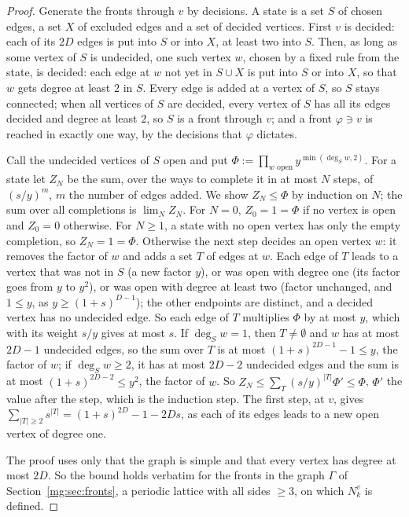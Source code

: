 \documentclass[11pt,a4paper]{article}
\theoremstyle{definition}
\theoremstyle{remark}
\begin{document}
\begin{proof}
Generate the fronts through $v$ by decisions. A state is a set $S$ of chosen edges, a set $X$ of excluded edges and a set of decided vertices. First $v$ is
decided: each of its $2D$ edges is put into $S$ or into $X$, at least two into $S$. Then, as long as some vertex of $S$ is undecided, one such vertex $w$,
chosen by a fixed rule from the state, is decided: each edge at $w$ not yet in $S\cup X$ is put into $S$ or into $X$, so that $w$ gets degree at least
$2$ in $S$. Every edge is added at a vertex of $S$, so $S$ stays connected; when all vertices of $S$ are decided, every vertex of $S$ has all its edges decided
and degree at least $2$, so $S$ is a front through $v$; and a front $\varphi\ni v$ is reached in exactly one way, by the decisions that $\varphi$ dictates.

Call the undecided vertices of $S$ open and put $\Phi:=\prod_{w\text{ open}}y^{\min(\deg_Sw,2)}$. For a state let $Z_N$ be the sum, over the ways to complete
it in at most $N$ steps, of $(s/y)^m$, $m$ the number of edges added. We show $Z_N\le\Phi$ by induction on $N$; the sum over all completions is $\lim_NZ_N$. For
$N=0$, $Z_0=1=\Phi$ if no vertex is open and $Z_0=0$ otherwise. For $N\ge1$, a state with no open vertex has only the empty completion, so $Z_N=1=\Phi$. Otherwise the next
step decides an open vertex $w$: it removes the factor of $w$ and adds a set $T$ of edges at $w$. Each edge of $T$ leads to a vertex that was not in $S$ (a new
factor $y$), or was open with degree one (its factor goes from $y$ to $y^2$), or was open with degree at least two (factor unchanged, and $1\le y$, as $y\ge(1+s)^{D-1}$); the other endpoints are
distinct, and a decided vertex has no undecided edge. So each edge of $T$ multiplies $\Phi$ by at most $y$, which with its weight $s/y$ gives at most $s$.
If $\deg_Sw=1$, then $T\ne\emptyset$ and $w$ has at most $2D-1$ undecided edges, so the sum over $T$ is at most $(1+s)^{2D-1}-1\le y$, the factor of $w$; if
$\deg_Sw\ge2$, it has at most $2D-2$ undecided edges and the sum is at most $(1+s)^{2D-2}\le y^2$, the factor of $w$. So $Z_N\le\sum_T(s/y)^{|T|}\Phi'\le\Phi$,
$\Phi'$ the value after the step, which is the induction step. The first
step, at $v$, gives $\sum_{|T|\ge2}s^{|T|}=(1+s)^{2D}-1-2Ds$, as each of its edges leads to a new open vertex of degree one.

The proof uses only that the graph is simple and that every vertex has degree at most $2D$. So the bound holds verbatim for the fronts in the graph $\Gamma$ of
Section~\ref{mg:sec:fronts}, a periodic lattice with all sides $\ge3$, on which $N^v_k$ is defined.
\end{proof}
\end{document}
